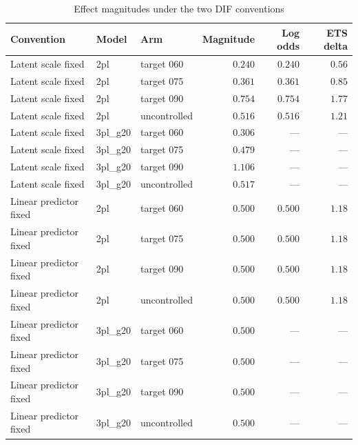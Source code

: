 \begin{table}[htbp]\centering
\caption{Effect magnitudes under the two DIF conventions}
\label{tab:s5c-magnitude}
{\small\begin{tabular}{lllrrr}
\toprule
Convention & Model & Arm & Magnitude & Log odds & ETS delta \\
\midrule
Latent scale fixed & 2pl & target 060 & $0.240$ & $0.240$ & $0.56$ \\
Latent scale fixed & 2pl & target 075 & $0.361$ & $0.361$ & $0.85$ \\
Latent scale fixed & 2pl & target 090 & $0.754$ & $0.754$ & $1.77$ \\
Latent scale fixed & 2pl & uncontrolled & $0.516$ & $0.516$ & $1.21$ \\
Latent scale fixed & 3pl\_g20 & target 060 & $0.306$ & --- & --- \\
Latent scale fixed & 3pl\_g20 & target 075 & $0.479$ & --- & --- \\
Latent scale fixed & 3pl\_g20 & target 090 & $1.106$ & --- & --- \\
Latent scale fixed & 3pl\_g20 & uncontrolled & $0.517$ & --- & --- \\
Linear predictor fixed & 2pl & target 060 & $0.500$ & $0.500$ & $1.18$ \\
Linear predictor fixed & 2pl & target 075 & $0.500$ & $0.500$ & $1.18$ \\
Linear predictor fixed & 2pl & target 090 & $0.500$ & $0.500$ & $1.18$ \\
Linear predictor fixed & 2pl & uncontrolled & $0.500$ & $0.500$ & $1.18$ \\
Linear predictor fixed & 3pl\_g20 & target 060 & $0.500$ & --- & --- \\
Linear predictor fixed & 3pl\_g20 & target 075 & $0.500$ & --- & --- \\
Linear predictor fixed & 3pl\_g20 & target 090 & $0.500$ & --- & --- \\
Linear predictor fixed & 3pl\_g20 & uncontrolled & $0.500$ & --- & --- \\
\bottomrule
\end{tabular}}
\end{table}
